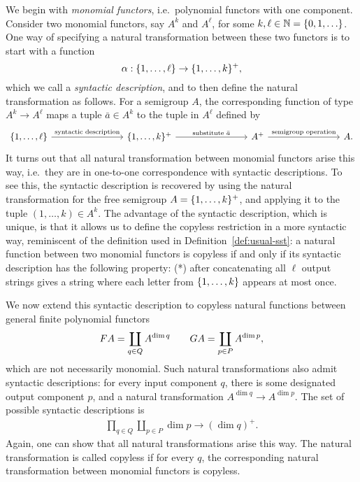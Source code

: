 We begin with \emph{monomial functors}, i.e.~polynomial functors with one component. 
Consider two monomial functors, say $A^k$ and $A^\ell$, for some  $k,\ell \in \mathbb{N} = \{0,1,\ldots\}$.
One way of specifying a natural transformation between these two functors is to start with a function 
\begin{equation}
\label{eq:syntactic-description}    \alpha : \{1,\ldots,\ell\} \to \{1,\ldots,k\}^+,
\end{equation}
which we call a \emph{syntactic description}, and to then  define the  natural transformation as follows. For a semigroup $A$, the corresponding function of type $A^k \to A^\ell$  maps a tuple $\bar a \in A^k$ to the tuple in $A^\ell$ defined by
\[
\begin{tikzcd}
    [column sep=2.8cm]
\set{1,\ldots,\ell}
\arrow[r, "\text{syntactic description}"]
&
\set{1,\ldots,k}^+ 
\ar[r,"\text{substitute $\bar a$}"]
& 
A^+
\ar[r,"\text{semigroup operation}"]
&
A.
\end{tikzcd}
\]
It turns out that all  natural transformation between monomial functors arise this way, i.e.~they are in one-to-one correspondence with syntactic descriptions. To see this, the syntactic description is recovered by using the natural transformation for the free semigroup $A=\{1,\ldots,k\}^+$, and applying it to the tuple $(1,\ldots,k) \in A^k$.
The advantage of the syntactic description, which is unique, is that it allows us to define the  {copyless restriction} in a more syntactic way, reminiscent of the definition used in Definition~\ref{def:usual-sst}:  a natural function between two monomial functors is copyless if and only if its syntactic description has the following property: (*) after concatenating all $\ell$ output strings gives a string where each letter from $\{1,\ldots,k\}$ appears at most once. 

We now extend this syntactic description to copyless natural functions between general finite polynomial  functors 
\begin{align*}
\functor A = \coprod_{q \in Q} A^{\dim q} \qquad 
\functorg A = \coprod_{p \in P} A^{\dim p},
\end{align*}
which are not necessarily monomial. Such natural transformations also admit syntactic descriptions: for every input component $q$, there is some designated output component $p$, and a natural transformation $A^{\dim q} \to A^{\dim p}$.  The set of possible syntactic descriptions is
\begin{align*}
\prod_{q \in Q} \coprod_{p \in P} \dim p \to (\dim q)^+.
\end{align*}
Again, one can show that all natural transformations arise this way. The natural transformation is called copyless if for every $q$, the corresponding natural transformation between monomial functors is copyless. 

